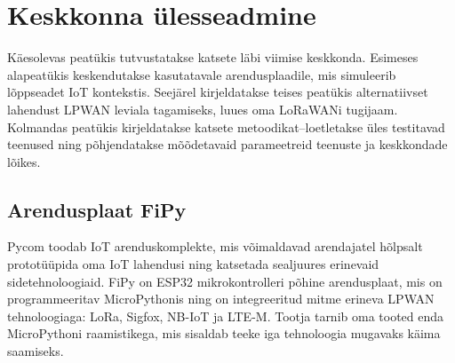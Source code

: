 \documentclass[12pt]{article}
\begin{document}


\newpage
\section{Keskkonna ülesseadmine}

Käesolevas peatükis tutvustatakse katsete läbi viimise keskkonda.
Esimeses alapeatükis keskendutakse kasutatavale arendusplaadile, mis simuleerib lõppseadet IoT kontekstis.
Seejärel kirjeldatakse teises peatükis alternatiivset lahendust LPWAN leviala tagamiseks, luues oma LoRaWANi tugijaam.
Kolmandas peatükis kirjeldatakse katsete metoodikat--loetletakse üles testitavad teenused ning põhjendatakse mõõdetavaid parameetreid teenuste ja keskkondade lõikes.

\subsection{Arendusplaat FiPy}

Pycom toodab IoT arenduskomplekte, mis võimaldavad arendajatel hõlpsalt prototüüpida oma IoT lahendusi ning katsetada sealjuures erinevaid sidetehnoloogiaid.
FiPy on ESP32 mikrokontrolleri põhine arendusplaat, mis on programmeeritav MicroPythonis ning on integreeritud mitme erineva LPWAN tehnoloogiaga: LoRa, Sigfox, NB-IoT ja LTE-M.
Tootja tarnib oma tooted enda MicroPythoni raamistikega, mis sisaldab teeke iga tehnoloogia mugavaks käima saamiseks.
\end{document}

